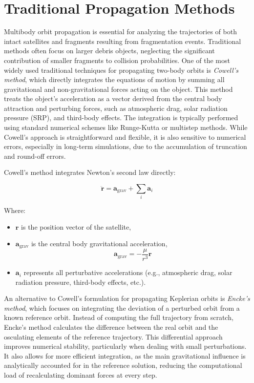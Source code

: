 \documentclass[letterpaper, paper,11pt]{AAS}
\begin{document}
\section{Traditional Propagation Methods}
Multibody orbit propagation is essential for analyzing the trajectories of both intact satellites and fragments resulting from fragmentation events. Traditional methods often focus on larger debris objects, neglecting the significant contribution of smaller fragments to collision probabilities. One of the most widely used traditional techniques for propagating two-body orbits is \textit{Cowell’s method}, which directly integrates the equations of motion by summing all gravitational and non-gravitational forces acting on the object. This method treats the object’s acceleration as a vector derived from the central body attraction and perturbing forces, such as atmospheric drag, solar radiation pressure (SRP), and third-body effects. The integration is typically performed using standard numerical schemes like Runge-Kutta or multistep methods. While Cowell’s approach is straightforward and flexible, it is also sensitive to numerical errors, especially in long-term simulations, due to the accumulation of truncation and round-off errors.

Cowell’s method integrates Newton’s second law directly:

\begin{equation}
\ddot{\mathbf{r}} = \mathbf{a}_{\text{grav}} + \sum_{i} \mathbf{a}_{i}
\end{equation}

Where:

\begin{itemize}
    \item $\mathbf{r}$ is the position vector of the satellite,
    \item $\mathbf{a}_{\text{grav}}$ is the central body gravitational acceleration,
    \begin{equation}
        \mathbf{a}_{\text{grav}} = -\frac{\mu}{r^3} \mathbf{r}
    \end{equation}
    \item $\mathbf{a}_{i}$ represents all perturbative accelerations (e.g., atmospheric drag, solar radiation pressure, third-body effects, etc.).
\end{itemize}

An alternative to Cowell’s formulation for propagating Keplerian orbits is \textit{Encke’s method}, which focuses on integrating the deviation of a perturbed orbit from a known reference orbit. Instead of computing the full trajectory from scratch, Encke’s method calculates the difference between the real orbit and the osculating elements of the reference trajectory. This differential approach improves numerical stability, particularly when dealing with small perturbations. It also allows for more efficient integration, as the main gravitational influence is analytically accounted for in the reference solution, reducing the computational load of recalculating dominant forces at every step.
\end{document}

